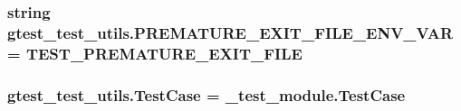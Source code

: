 \subsubsection[{\texorpdfstring{P\+R\+E\+M\+A\+T\+U\+R\+E\+\_\+\+E\+X\+I\+T\+\_\+\+F\+I\+L\+E\+\_\+\+E\+N\+V\+\_\+\+V\+AR}{PREMATURE_EXIT_FILE_ENV_VAR}}]{\setlength{\rightskip}{0pt plus 5cm}string gtest\+\_\+test\+\_\+utils.\+P\+R\+E\+M\+A\+T\+U\+R\+E\+\_\+\+E\+X\+I\+T\+\_\+\+F\+I\+L\+E\+\_\+\+E\+N\+V\+\_\+\+V\+AR = \textquotesingle{}T\+E\+S\+T\+\_\+\+P\+R\+E\+M\+A\+T\+U\+R\+E\+\_\+\+E\+X\+I\+T\+\_\+\+F\+I\+LE\textquotesingle{}}\hypertarget{namespacegtest__test__utils_aa961c38a16224b2e7fd8c93fc1d2a90f}{}\label{namespacegtest__test__utils_aa961c38a16224b2e7fd8c93fc1d2a90f}
\subsubsection[{\texorpdfstring{Test\+Case}{TestCase}}]{\setlength{\rightskip}{0pt plus 5cm}gtest\+\_\+test\+\_\+utils.\+Test\+Case = \+\_\+test\+\_\+module.\+Test\+Case}\hypertarget{namespacegtest__test__utils_acb97a85206c09d233db6c7f2362e5428}{}\label{namespacegtest__test__utils_acb97a85206c09d233db6c7f2362e5428}

